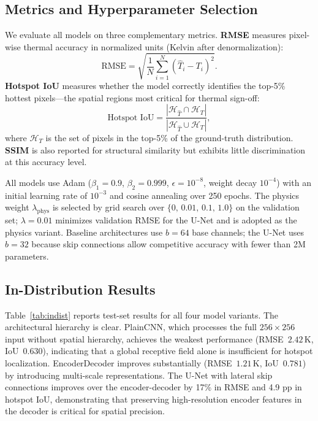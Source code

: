 \documentclass[10pt,twocolumn,letterpaper]{article}
\begin{document}
\subsection{Metrics and Hyperparameter Selection}

We evaluate all models on three complementary metrics. \textbf{RMSE}
measures pixel-wise thermal accuracy in normalized units (Kelvin after
denormalization):
\begin{equation}
  \text{RMSE} = \sqrt{\frac{1}{N}\sum_{i=1}^{N}(\hat{T}_i - T_i)^2}.
  \label{eq:rmse}
\end{equation}
\textbf{Hotspot IoU} measures whether the model correctly identifies
the top-5\% hottest pixels---the spatial regions most critical for
thermal sign-off:
\begin{equation}
  \text{Hotspot IoU} =
  \frac{|\mathcal{H}_{\hat{T}} \cap \mathcal{H}_{T}|}
       {|\mathcal{H}_{\hat{T}} \cup \mathcal{H}_{T}|},
  \label{eq:iou}
\end{equation}
where $\mathcal{H}_T$ is the set of pixels in the top-5\% of the
ground-truth distribution. \textbf{SSIM} is also reported for
structural similarity but exhibits little discrimination at this
accuracy level.

All models use Adam ($\beta_1{=}0.9$, $\beta_2{=}0.999$,
$\epsilon{=}10^{-8}$, weight decay $10^{-4}$) with an initial
learning rate of $10^{-3}$ and cosine annealing over 250 epochs.
The physics weight $\lambda_\text{phys}$ is selected by grid search
over $\{0,\,0.01,\,0.1,\,1.0\}$ on the validation set;
$\lambda{=}0.01$ minimizes validation RMSE for the U-Net and is
adopted as the physics variant. Baseline architectures use
$b{=}64$ base channels; the U-Net uses $b{=}32$ because skip
connections allow competitive accuracy with fewer than 2M parameters.

\subsection{In-Distribution Results}

Table~\ref{tab:indist} reports test-set results for all four model
variants. The architectural hierarchy is clear. PlainCNN, which
processes the full $256{\times}256$ input without spatial hierarchy,
achieves the weakest performance (RMSE~$2.42$\,K, IoU~$0.630$),
indicating that a global receptive field alone is insufficient for
hotspot localization. EncoderDecoder improves substantially
(RMSE~$1.21$\,K, IoU~$0.781$) by introducing multi-scale
representations. The U-Net with lateral skip connections improves
over the encoder-decoder by 17\% in RMSE and 4.9 pp in hotspot IoU,
demonstrating that preserving high-resolution encoder features in
the decoder is critical for spatial precision.
\end{document}
